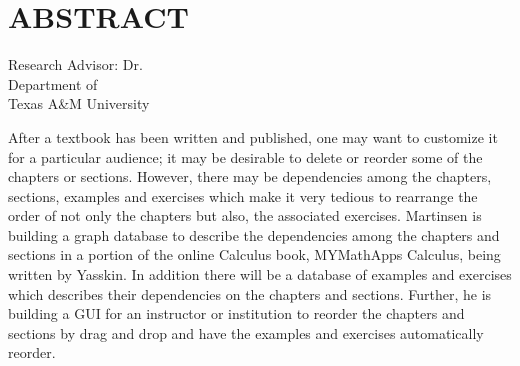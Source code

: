 %
%
%
%

\chapter*{ABSTRACT}


\pagestyle{plain} %
\setcounter{page}{1}
\begin{center}

\begin{singlespace}
\abstracttitle
\end{singlespace}
\vspace{2em}
\vspace{2em}
\begin{singlespace}
Research Advisor: Dr. \ursadvisor \\
Department of \advisordepartment \\
Texas A\&M University \\
\end{singlespace}
\end{center}
\vspace{2em}

\indent After a textbook has been written and published, one may want to customize it for a particular audience; it may be desirable to delete or reorder some of the chapters or sections. However, there may be dependencies among the chapters, sections, examples and exercises which make it very tedious to rearrange the order of not only the chapters but also, the associated exercises. Martinsen is building a graph database to describe the dependencies among the chapters and sections in a portion of the online Calculus book, MYMathApps Calculus, being written by Yasskin. In addition there will be a database of examples and exercises which describes their dependencies on the chapters and sections. Further, he is building a GUI for an instructor or institution to reorder the chapters and sections by drag and drop and have the examples and exercises automatically reorder.


\pagebreak{}
